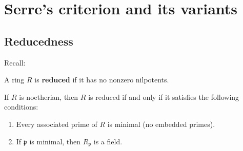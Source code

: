 \section{Serre's criterion and its variants}
\subsection{Reducedness}

Recall:

\begin{definition}
A ring $R$ is \textbf{reduced} if it has no nonzero nilpotents.
\end{definition}

\begin{proposition}
If $R$ is noetherian, then $R$ is reduced if and only if it satisfies the
following conditions:
\begin{enumerate}
\item Every associated prime of $R$ is	minimal (no embedded primes).
\item If $\mathfrak{p}$ is minimal, then $R_{\mathfrak{p}}$ is	a field.
\end{enumerate}
\end{proposition}
